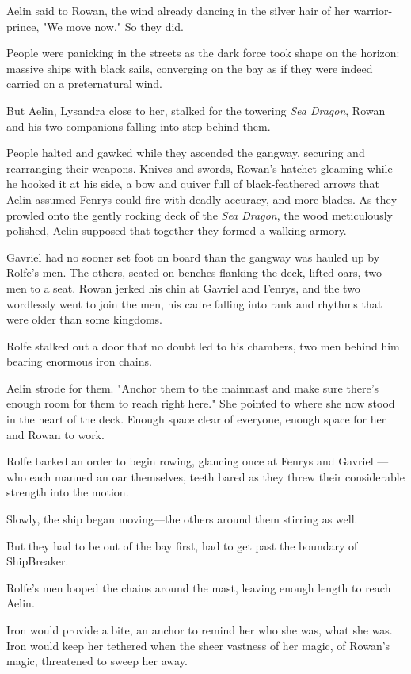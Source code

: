 Aelin said to Rowan, the wind already dancing in the silver hair of her warrior-prince, "We move now." So they did.

People were panicking in the streets as the dark force took shape on the horizon: massive ships with black sails, converging on the bay as if they were indeed carried on a preternatural wind.

But Aelin, Lysandra close to her, stalked for the towering \emph{Sea Dragon}, Rowan and his two companions falling into step behind them.

People halted and gawked while they ascended the gangway, securing and rearranging their weapons. Knives and swords, Rowan's hatchet gleaming while he hooked it at his side, a bow and quiver full of black-feathered arrows that Aelin assumed Fenrys could fire with deadly accuracy, and more blades. As they prowled onto the gently rocking deck of the
\emph{Sea Dragon}, the wood meticulously polished, Aelin supposed that together they formed a walking armory.

Gavriel had no sooner set foot on board than the gangway was hauled up by Rolfe's men. The others, seated on benches flanking the deck, lifted oars, two men to a seat. Rowan jerked his chin at Gavriel and Fenrys, and the two wordlessly went to join the men, his cadre falling into rank and rhythms that were older than some kingdoms.

Rolfe stalked out a door that no doubt led to his chambers, two men behind him bearing enormous iron chains.

Aelin strode for them. "Anchor them to the mainmast and make sure there's enough room for them to reach right  here." She pointed to where she now stood in the heart of the deck. Enough space clear of everyone, enough space for her and Rowan to work.

Rolfe barked an order to begin rowing, glancing once at Fenrys and Gavriel ---who each manned an oar themselves, teeth bared as they threw their considerable strength into the motion.

Slowly, the ship began moving---the others around them stirring as well.

But they had to be out of the bay first, had to get past the boundary of ShipBreaker.

Rolfe's men looped the chains around the mast, leaving enough length to reach Aelin.

Iron would provide a bite, an anchor to remind her who she was, what she was. Iron would keep her tethered when the sheer vastness of her magic, of Rowan's magic, threatened to sweep her away.

